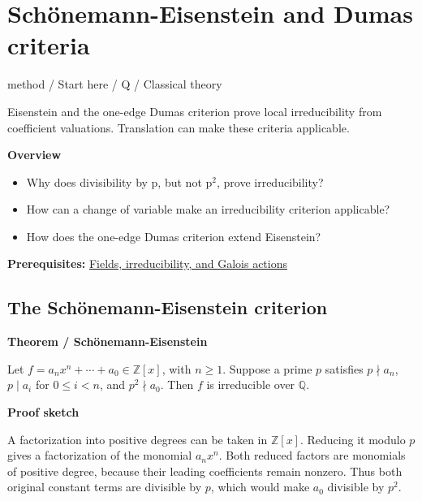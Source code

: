 \documentclass[11pt,a4paper,oneside,openany]{book}
\begin{document}
\chapter{Schönemann-Eisenstein and Dumas criteria}\label{article:eisenstein-dumas}\hypertarget{article:eisenstein-dumas}{}\color{black}
{\sffamily\small\color{atlasgold}method / Start here / Q / Classical theory}\par\medskip
Eisenstein and the one-edge Dumas criterion prove local irreducibility from coefficient valuations. Translation can make these criteria applicable.\par\medskip
\textbf{Overview}\begin{itemize}
\item Why does divisibility by p, but not p\ensuremath{{}^2}, prove irreducibility?
\item How can a change of variable make an irreducibility criterion applicable?
\item How does the one-edge Dumas criterion extend Eisenstein?
\end{itemize}
{\small\textbf{Prerequisites:} \hyperlink{article:foundations}{Fields, irreducibility, and Galois actions}}\par
{}\section{The Schönemann-Eisenstein criterion}

\begin{atlasblock}[standard]
\textbf{\sffamily Theorem  /  Schönemann-Eisenstein}\par\smallskip
\color{black} Let \(f=a_nx^n+\cdots+a_0\in\mathbb Z[x]\), with \(n\ge1\). Suppose a prime \(p\) satisfies \(p\nmid a_n\), \(p\mid a_i\) for \(0\le i<n\), and \(p^2\nmid a_0\). Then \(f\) is irreducible over \(\mathbb Q\).\par
\end{atlasblock}\color{black}


\begin{atlasblock}[standard]
\textbf{\sffamily Proof sketch}\par\smallskip
\color{black} A factorization into positive degrees can be taken in \(\mathbb Z[x]\). Reducing it modulo \(p\) gives a factorization of the monomial \(a_nx^n\). Both reduced factors are monomials of positive degree, because their leading coefficients remain nonzero. Thus both original constant terms are divisible by \(p\), which would make \(a_0\) divisible by \(p^2\).\par
\end{atlasblock}\color{black}
\end{document}
